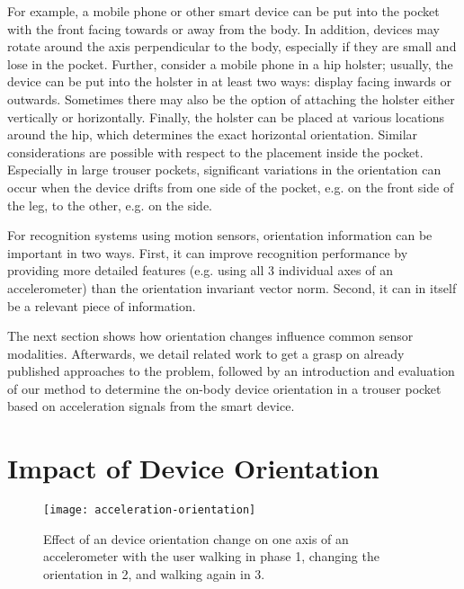 For example, a mobile phone or other smart device can
be put into the pocket with the front facing towards or away from the
body. In addition, devices may rotate around the axis perpendicular to
the body, especially if they are small and lose in the pocket. Further, consider a mobile phone in a hip holster; usually, 
the device can be put into the holster in at least two ways:
display facing inwards or outwards. Sometimes there may also be the
option of attaching the holster either vertically or
horizontally. Finally, the holster can be placed at various locations
around the hip, which determines the exact horizontal orientation.
Similar considerations are possible with respect to the
placement inside the pocket. Especially in large trouser pockets, significant
variations in the orientation can occur when the device drifts from
one side of the pocket, e.g. on the front side of the leg, to the
other, e.g. on the side. 

For recognition systems using motion sensors, orientation information
can be important in two ways. First, it can improve recognition
performance by providing more detailed features (e.g. using all 3
individual axes of an accelerometer) than the orientation invariant
vector norm. Second, it can in itself be a relevant piece of
information. 
 
The next section shows how orientation changes influence common sensor
modalities. Afterwards, we detail related work to get a grasp on
already published approaches to the problem, followed by an
introduction and evaluation of our method to determine the on-body
device orientation in a trouser pocket based on acceleration signals from the smart device.


\section{Impact of Device Orientation}
\label{orient:impact}


\begin{figure}[t]
  \begin{center}
  \texttt{[image: acceleration-orientation]}
	\end{center}
\caption[Orientation changes]{Effect of an device orientation change on one axis of an
 accelerometer with the user walking in phase 1, changing the
 orientation in 2, and walking again in
 3.} \label{fig:accelorient} \end{figure}

